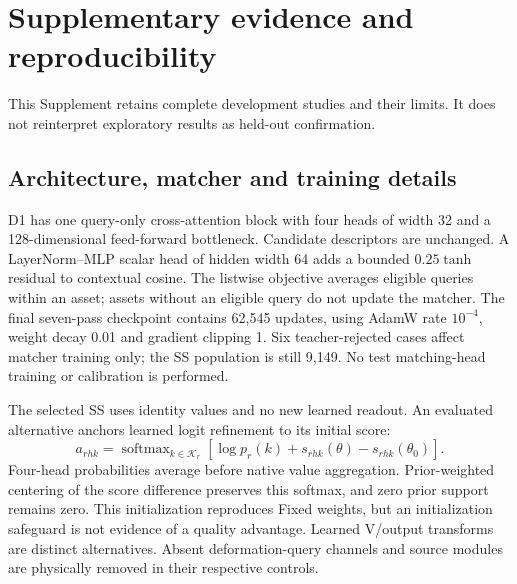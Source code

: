 \section{Supplementary evidence and reproducibility}
This Supplement retains complete development studies and their limits. It
does not reinterpret exploratory results as held-out confirmation.




\subsection{Architecture, matcher and training details}
D1 has one query-only cross-attention block with four heads of width 32 and
a 128-dimensional feed-forward bottleneck. Candidate descriptors are unchanged.
A LayerNorm--MLP scalar head of hidden width 64 adds a bounded
$0.25\tanh$ residual to contextual cosine. The listwise objective averages
eligible queries within an asset; assets without an eligible query do not
update the matcher. The final seven-pass checkpoint contains 62,545 updates,
using AdamW rate $10^{-4}$, weight decay 0.01 and gradient clipping 1. Six
teacher-rejected cases affect matcher training only; the SS population is
still 9,149. No test matching-head training or calibration is performed.

The selected SS uses identity values and no new learned readout. An evaluated
alternative anchors learned logit refinement to its initial score:
\begin{equation}
 a_{rhk}=\operatorname{softmax}_{k\in\mathcal K_r}
 [\log p_r(k)+s_{rhk}(\theta)-s_{rhk}(\theta_0)].
\end{equation}
Four-head probabilities average before native value aggregation. Prior-weighted
centering of the score difference preserves this softmax, and zero prior
support remains zero. This initialization reproduces Fixed weights, but an
initialization safeguard is not evidence of a quality advantage. Learned
V/output transforms are distinct alternatives. Absent deformation-query
channels and source modules are physically removed in their respective
controls.

